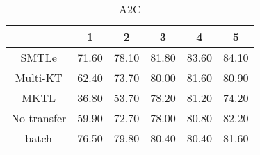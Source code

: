 \begin{table}[htbp]
  \centering
  \caption{A2C}
    \begin{tabular}{cccccc}
    \toprule
          & 1     & 2     & 3     & 4     & 5 \\
    \midrule
    SMTLe & 71.60 & 78.10 & 81.80 & 83.60 & 84.10 \\
    Multi-KT & 62.40 & 73.70 & 80.00 & 81.60 & 80.90 \\
    MKTL  & 36.80 & 53.70 & 78.20 & 81.20 & 74.20 \\
    No transfer & 59.90 & 72.70 & 78.00 & 80.80 & 82.20 \\
    batch & 76.50 & 79.80 & 80.40 & 80.40 & 81.60 \\
    \bottomrule
    \end{tabular}%
\end{table}%

